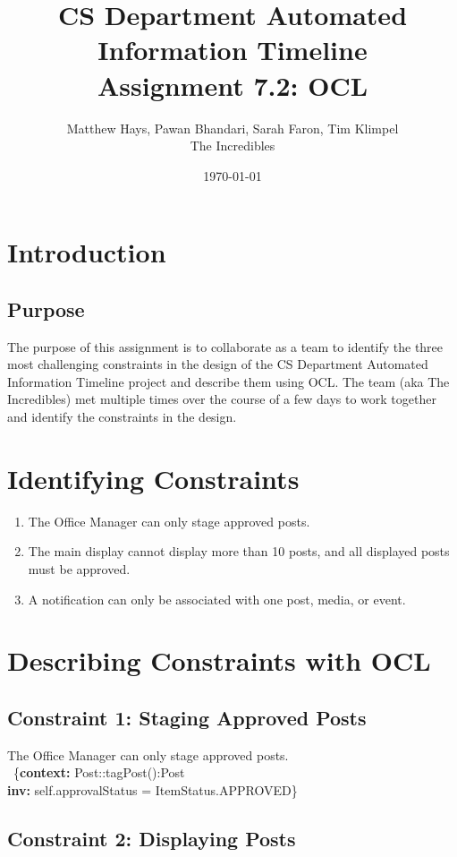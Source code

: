 \documentclass{article}
\title{CS Department Automated Information Timeline \\ Assignment 7.2: OCL}
\date{\today}
\author{Matthew Hays, Pawan Bhandari, Sarah Faron, Tim Klimpel \\ The Incredibles}
\begin{document}
\maketitle
\newpage
\tableofcontents
\listoffigures
\newpage
\section{Introduction}
\subsection{Purpose}
The purpose of this assignment is to collaborate as a team to identify the three most challenging constraints in the design of the CS Department Automated Information Timeline project and describe them using OCL. The team (aka The Incredibles) met multiple times over the course of a few days to work together and identify the constraints in the design.

\section{Identifying Constraints}
\begin{enumerate}
    \item The Office Manager can only stage approved posts.
    \item The main display cannot display more than 10 posts, and all displayed posts must be approved.
    \item A notification can only be associated with one post, media, or event.
\end{enumerate}

\section{Describing Constraints with OCL}

\subsection{Constraint 1: Staging Approved Posts}

The Office Manager can only stage approved posts. \\
\
\{\textbf{context:} Post::tagPost():Post \\
\textbf{inv:} self.approvalStatus = ItemStatus.APPROVED\} \\

\subsection{Constraint 2: Displaying Posts}
\end{document}
